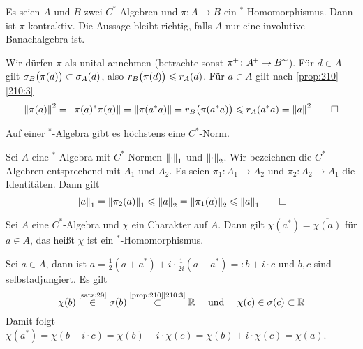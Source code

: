 \begin{korollar}[label=kor:211,{name=[*-Homomorphismen sind kontraktiv]}]
	Es seien $A$ und $B$ zwei $C^*$-Algebren und $\pi \colon A \to B$ ein ${}^*$-Homomorphismus. Dann ist $\pi$ kontraktiv.
	Die Aussage bleibt richtig, falls $A$ nur eine involutive Banachalgebra ist. 
\end{korollar}
\begin{beweis}
	Wir dürfen $\pi$ als unital annehmen (betrachte sonst $\pi^{\hspace{-0.5pt}+}\colon A^{\hspace{-0.9pt}+} \to B^{\hspace{-0.5pt}\sim}$). 
	Für $d \in A$ gilt $\sigma_B \enbrace[\big]{\pi(d)} \subset \sigma_A(d)$, also $r_B \enbrace[\big]{\pi(d)} \le r_A(d)$. 
	Für $a \in A$ gilt nach \autoref{prop:210} \ref{210:3}
	\[
		\norm*{\pi(a)}^2 = \norm*{\pi(a)^* \pi(a)} = \norm*{\pi(a^*a)} = r_B \enbrace[\big]{\pi(a^*a)} \le r_A(a^*a) = \norm*{a}^2 \qedhere
	\]
\end{beweis}

\begin{korollar}[{name=[höchstens eine $C^*$-Norm]},label=korr:212]
	Auf einer ${}^*$-Algebra gibt es höchstens eine $C^*$-Norm.
\end{korollar}
\begin{beweis}
	Sei $A$ eine ${}^*$-Algebra mit $C^*$-Normen $\norm*{\cdot}_1$ und $\norm*{\cdot}_2$. 
	Wir bezeichnen die $C^*$-Algebren entsprechend mit $A_1$ und $A_2$. 
	Es seien $\pi_1 \colon A_1 \to A_2$ und $\pi_2 \colon A_2 \to A_1$ die Identitäten. Dann gilt
	\[
		\norm*{a}_1 = \norm*{\pi_2(a)}_1 \le \norm*{a}_2 = \norm*{\pi_1(a)}_2 \le \norm*{a}_1 \qedhere
	\]
\end{beweis}

\begin{korollar}[label=kor:213,{name=[Charaktere sind *-Homomorphismen]}]
	Sei $A$ eine $C^*$-Algebra und $\chi$ ein Charakter auf $A$. Dann gilt $\chi(a^*) = \overline{\chi(a)}$ für $a \in A$, das heißt $\chi$ ist ein ${}^*$-Homomorphismus.
\end{korollar}
\begin{beweis}
	Sei $a \in A$, dann ist $a=\frac{1}{2}(a+a^*) + i \cdot \frac{1}{2i}(a-a^*) =: b + i \cdot c$ und $b,c$ sind selbstadjungiert. Es gilt 
	\[
		\chi(b) \StackText{\ref{satz:29}}{\in} \sigma(b) \StackText{\ref{prop:210}\ref{210:3}}{\subset} \mathbb{R} \quad \text{ und } \quad \chi(c) \in \sigma(c) \subset \mathbb{R} 
	\]
	Damit folgt $\chi(a^*) = \chi(b - i \cdot c) = \chi(b) - i \cdot \chi(c) = \overline{\chi(b) + i \cdot \chi(c)} = \overline{\chi(a)}$.
\end{beweis}

